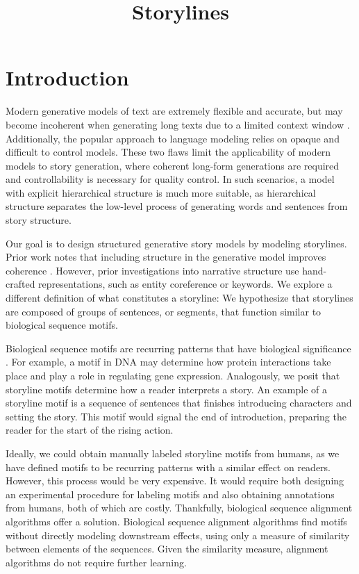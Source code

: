 \documentclass{article}
\title{Storylines}
\begin{document}
\maketitle

\section{Introduction}
Modern generative models of text are extremely flexible and accurate,
but may become incoherent when generating long texts due to a limited context window
\citep{brown2020language,rakshin2020plotmachines}.
Additionally, the popular approach to language modeling relies on opaque
and difficult to control models.
These two flaws limit the applicability of modern models to story generation,
where coherent long-form generations are required
and controllability is necessary for quality control.
In such scenarios, a model with explicit hierarchical structure is much more suitable,
as hierarchical structure separates the low-level process of generating 
words and sentences from story structure.

Our goal is to design structured generative story models by modeling storylines.
Prior work notes that including structure in the generative model improves coherence
\citep{yao2018storyline,fan2019structure,ippolito2019rarewords,chandu2020narrative,rakshin2020plotmachines}.
However, prior investigations into narrative structure use hand-crafted representations,
such as entity coreference or keywords.
We explore a different definition of what constitutes a storyline:
We hypothesize that storylines are composed of groups of sentences, or segments, that function
similar to biological sequence motifs.

Biological sequence motifs are recurring patterns that have
biological significance \citep{biomotif}.
For example, a motif in DNA may determine how protein interactions take place
and play a role in regulating gene expression.
Analogously, we posit that storyline motifs determine how a reader interprets a story.
An example of a storyline motif is a sequence of sentences that finishes 
introducing characters and setting the story.
This motif would signal the end of introduction, preparing the reader for 
the start of the rising action.

Ideally, we could obtain manually labeled storyline motifs from humans,
as we have defined motifs to be recurring patterns with a similar effect on readers.
However, this process would be very expensive.
It would require both designing an experimental procedure for labeling motifs
and also obtaining annotations from humans, both of which are costly.
Thankfully, biological sequence alignment algorithms offer a solution.
Biological sequence alignment algorithms find motifs without directly modeling
downstream effects, using only a measure of similarity between elements of the sequences.
Given the similarity measure, alignment algorithms do not require further learning.
\end{document}
